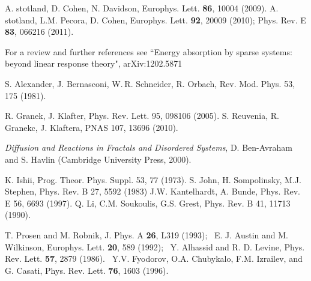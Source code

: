 \documentclass[onecolumn,fleqn,12pt,openany,draft]{book}
\begin{document}
\begin{thebibliography}{99}
%
A. stotland, D. Cohen, N. Davidson, 
Europhys. Lett. {\bf 86}, 10004 (2009).
%
A. stotland, L.M. Pecora, D. Cohen, 
Europhys. Lett. {\bf 92}, 20009 (2010);
Phys. Rev. E {\bf 83}, 066216 (2011).


For a review and further references 
see ``Energy absorption by sparse systems: 
beyond linear response theory",	arXiv:1202.5871  


S. Alexander, J. Bernasconi, W. R. Schneider, R. Orbach, 
Rev. Mod. Phys. 53, 175 (1981).

R. Granek, J. Klafter, Phys. Rev. Lett. 95, 098106 (2005).
S. Reuvenia, R. Granekc, J. Klaftera, PNAS 107, 13696 (2010).

{\em Diffusion and Reactions in Fractals and Disordered Systems},
D. Ben-Avraham and S. Havlin (Cambridge University Press, 2000).

K. Ishii, 
Prog. Theor. Phys. Suppl. 53, 77 (1973).
%
%
S. John, H. Sompolinsky, M.J. Stephen,  
Phys. Rev. B 27, 5592 (1983) 
%
%
J.W. Kantelhardt, A. Bunde, 
Phys. Rev. E 56, 6693 (1997).
%
%
Q. Li, C.M. Soukoulis, G.S. Grest,
Phys. Rev. B 41, 11713 (1990).  


T. Prosen and M. Robnik, J. Phys. A {\bf 26}, L319 (1993); \
E. J. Austin and M. Wilkinson, Europhys. Lett. {\bf 20}, 589 (1992); \ 
Y. Alhassid and R. D. Levine, Phys. Rev. Lett. {\bf 57}, 2879 (1986). \
Y.V. Fyodorov, O.A. Chubykalo, F.M. Izrailev, and G. Casati, 
Phys. Rev. Lett. {\bf 76}, 1603 (1996).


\end{thebibliography}




 



\ \\ \ \\ \ \\ \ \\ \ \\ \ \\ 
\end{document}
